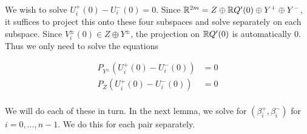 \documentclass[thesis.tex]{subfiles}
\begin{document}
We wish to solve $U_i^+(0) - U_i^-(0) = 0$. Since ${\mathbb R}^{2m} = Z \oplus {\mathbb R} Q'(0) \oplus Y^+ \oplus Y^-$, it suffices to project this onto these four subspaces and solve separately on each subspace. Since $V_i^\pm(0) \in Z \oplus Y^\pm$, the projection on ${\mathbb R} Q'(0)$ is automatically 0. Thus we only need to solve the equations

\begin{align*}
P_{Y^\pm}(U_i^+(0) - U_i^-(0)) &= 0 \\
P_Z(U_i^+(0) - U_i^-(0)) &= 0 \\
\end{align*}

We will do each of these in turn. In the next lemma, we solve for $(\beta_i^+, \beta_i^-)$ for $i = 0, \dots, n-1$. We do this for each pair separately.

\end{document}
